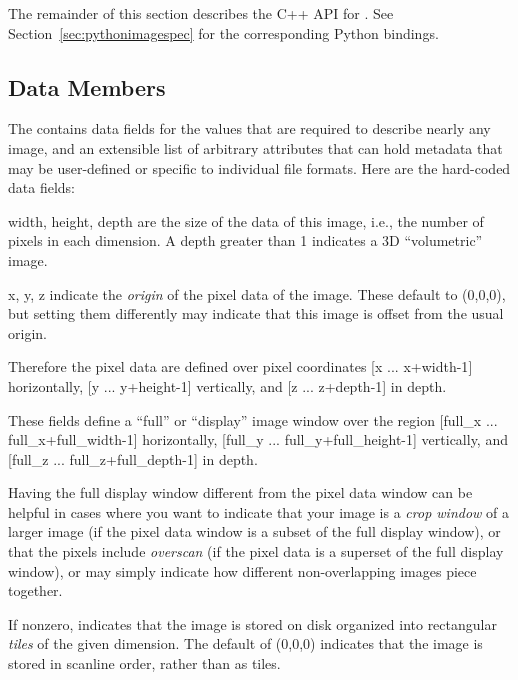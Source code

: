 The remainder of this section describes the C++ API for \ImageSpec.
See Section~\ref{sec:pythonimagespec} for the corresponding Python
bindings.

\subsection{\ImageSpec Data Members}

The \ImageSpec contains data fields for the values that are
required to describe nearly any image, and an extensible list of
arbitrary attributes that can hold metadata that may be user-defined or
specific to individual file formats.  Here are the hard-coded data
fields:


{\cf width, height, depth} are the size of the data of this image, i.e.,
the number of pixels in each dimension.  A {\cf depth} greater than 1
indicates a 3D ``volumetric'' image.

{\cf x, y, z} indicate the \emph{origin} of the pixel data of the image.
These default to (0,0,0), but setting them differently may indicate that
this image is offset from the usual origin.

Therefore the pixel data are defined over pixel coordinates
[{\cf x} ... {\cf x+width-1}] horizontally, 
[{\cf y} ... {\cf y+height-1}] vertically, 
and [{\cf z} ... {\cf z+depth-1}] in depth.
\apiend


These fields define a ``full'' or ``display'' image window over the
region [{\cf full_x} ... {\cf full_x+full_width-1}] horizontally, 
[{\cf full_y} ... {\cf full_y+full_height-1}] vertically, 
and [{\cf full_z} ... {\cf full_z+full_depth-1}] in depth.

Having the full display window different from the pixel data window can
be helpful in cases where you want to indicate that your image is a
\emph{crop window} of a larger image (if the pixel data window is a
subset of the full display window), or that the pixels include
\emph{overscan} (if the pixel data is a superset of the full display
window), or may simply indicate how different non-overlapping images
piece together.
\apiend

If nonzero, indicates that the image is stored on disk organized into
rectangular \emph{tiles} of the given dimension.  The default of 
(0,0,0) indicates that the image is stored in scanline order, rather
than as tiles.
\apiend

